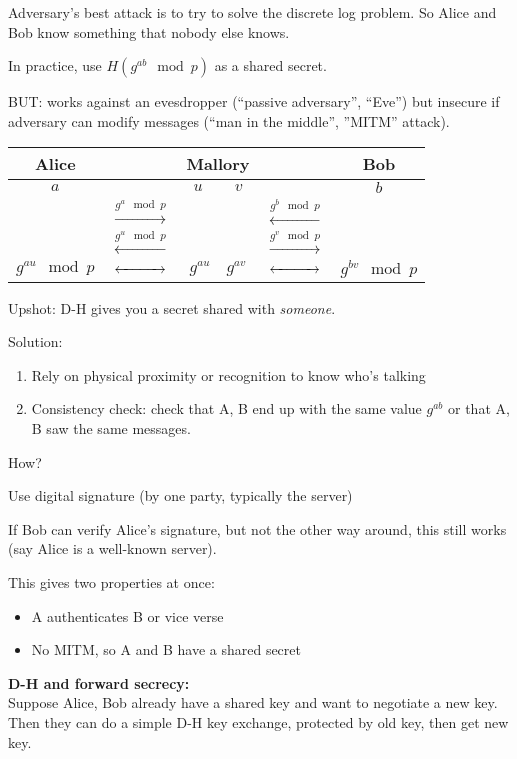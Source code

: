 Adversary's best attack is to try to solve the discrete log problem. So Alice
and Bob know something that nobody else knows.

In practice, use $H(g^{ab} \mod p)$ as a shared secret.

BUT: works against an evesdropper (``passive adversary'', ``Eve'') but insecure
if adversary can modify messages (``man in the middle'', ''MITM'' attack). 

\begin{table}[h!]
\centering
\begin{tabular}{ccccc}
Alice & & Mallory & & Bob\\
\hline
$a$ & & $u \qquad v$ & & $b$\\
& $\xrightarrow{g^a \mod p}$ & & $\xleftarrow{g^b \mod p}$ &\\
& $\xleftarrow{g^u \mod p}$ & & $\xrightarrow{g^v \mod p}$ &\\
$g^{au} \mod p$ & $\xleftrightarrow{\qquad\quad}$ & $g^{au} \quad g^{av}$ & $\xleftrightarrow{\qquad\quad}$ & $g^{bv} \mod p$
\end{tabular}
\end{table}

Upshot: D-H gives you a secret shared with \emph{someone}.

Solution:
\begin{enumerate}
    \item Rely on physical proximity or recognition to know who's talking
    \item Consistency check: check that A, B end up with the same value $g^{ab}$
        or that A, B saw the same messages.
\end{enumerate}
How?

Use digital signature (by one party, typically the server)

If Bob can verify Alice's signature, but not the other way around, this still
works (say Alice is a well-known server).

This gives two properties at once:
\begin{itemize}
    \item A authenticates B or vice verse
    \item No MITM, so A and B have a shared secret
\end{itemize}

{\bf D-H and forward secrecy:}\\
Suppose Alice, Bob already have a shared key and want to negotiate a new key.
Then they can do a simple D-H key exchange, protected by old key, then get new
key.

